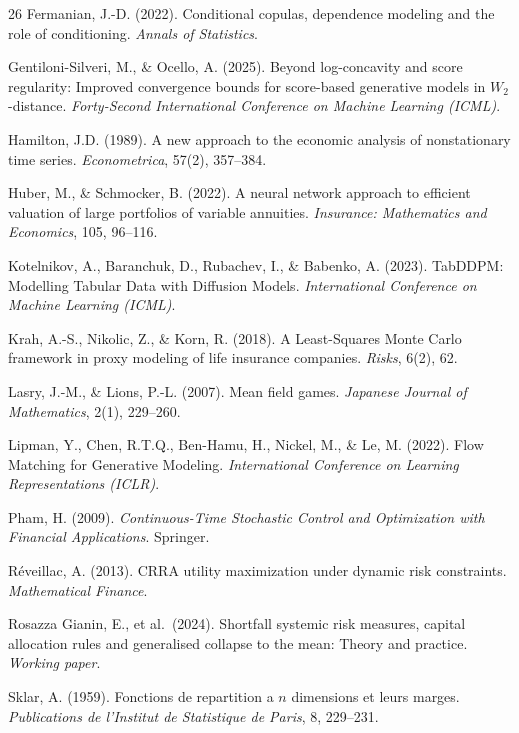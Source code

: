 \documentclass[11pt,a4paper]{article}
\begin{document}
\begin{thebibliography}{26}
Fermanian, J.-D. (2022).
Conditional copulas, dependence modeling and the role of conditioning.
\emph{Annals of Statistics}.

Gentiloni-Silveri, M., \& Ocello, A. (2025).
Beyond log-concavity and score regularity: Improved convergence bounds
for score-based generative models in $W_2$-distance.
\emph{Forty-Second International Conference on Machine Learning (ICML)}.

Hamilton, J.D. (1989).
A new approach to the economic analysis of nonstationary time series.
\emph{Econometrica}, 57(2), 357--384.

Huber, M., \& Schmocker, B. (2022).
A neural network approach to efficient valuation of large portfolios
of variable annuities.
\emph{Insurance: Mathematics and Economics}, 105, 96--116.

Kotelnikov, A., Baranchuk, D., Rubachev, I., \& Babenko, A. (2023).
TabDDPM: Modelling Tabular Data with Diffusion Models.
\emph{International Conference on Machine Learning (ICML)}.

Krah, A.-S., Nikolic, Z., \& Korn, R. (2018).
A Least-Squares Monte Carlo framework in proxy modeling of life
insurance companies.
\emph{Risks}, 6(2), 62.

Lasry, J.-M., \& Lions, P.-L. (2007).
Mean field games.
\emph{Japanese Journal of Mathematics}, 2(1), 229--260.

Lipman, Y., Chen, R.T.Q., Ben-Hamu, H., Nickel, M., \& Le, M. (2022).
Flow Matching for Generative Modeling.
\emph{International Conference on Learning Representations (ICLR)}.

Pham, H. (2009).
\emph{Continuous-Time Stochastic Control and Optimization
with Financial Applications}. Springer.

R\'{e}veillac, A. (2013).
CRRA utility maximization under dynamic risk constraints.
\emph{Mathematical Finance}.

Rosazza Gianin, E., et al.\ (2024).
Shortfall systemic risk measures, capital allocation rules and
generalised collapse to the mean: Theory and practice.
\emph{Working paper}.

Sklar, A. (1959).
Fonctions de repartition a $n$ dimensions et leurs marges.
\emph{Publications de l'Institut de Statistique de Paris}, 8, 229--231.


\end{thebibliography}
\end{document}
